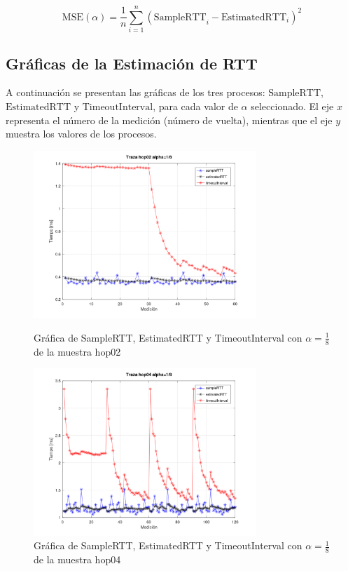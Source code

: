 \begin{equation}
  \text{MSE}(\alpha) = \frac{1}{n} \sum_{i=1}^{n} ( \text{SampleRTT}_i - \text{EstimatedRTT}_i )^2
\end{equation}

\subsection*{Gráficas de la Estimación de RTT}
\noindent A continuación se presentan las gráficas de los tres procesos: \( \text{SampleRTT} \), 
\( \text{EstimatedRTT} \) y \( \text{TimeoutInterval} \), para cada valor de \( \alpha \) 
seleccionado. El eje \( x \) representa el número de la medición (número de vuelta), 
mientras que el eje \( y \) muestra los valores de los procesos.

\begin{figure}[H]
    \centering
    \includegraphics[width=0.75\textwidth]{img/alpha18/trazahop02.png}
    \caption{Gráfica de SampleRTT, EstimatedRTT y TimeoutInterval con \( \alpha = \frac{1}{8} \)
    de la muestra hop02}

    \includegraphics[width=0.75\textwidth]{img/alpha18/trazaHop04.png}
    \caption{Gráfica de SampleRTT, EstimatedRTT y TimeoutInterval con \( \alpha = \frac{1}{8} \)
    de la muestra hop04}
    \label{fig:alpha_default_p1}
\end{figure}
